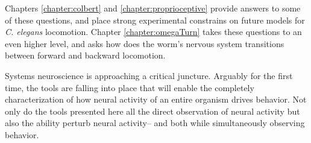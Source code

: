 Chapters \ref{chapter:colbert} and \ref{chapter:proprioceptive} provide answers to some of these questions, and place strong experimental constrains on future models for \textit{C. elegans} locomotion.  Chapter \ref{chapter:omegaTurn} takes these questions to an even higher level, and asks how does the worm's nervous system transitions between forward and backward locomotion. 

Systems neuroscience is approaching  a critical juncture. Arguably for the first time, the tools are falling into place that will enable the  completely characterization of how  neural activity of an entire organism drives behavior. Not only  do the tools presented here all the direct observation of neural activity but also the ability perturb neural activity-- and both while simultaneously observing behavior. 







